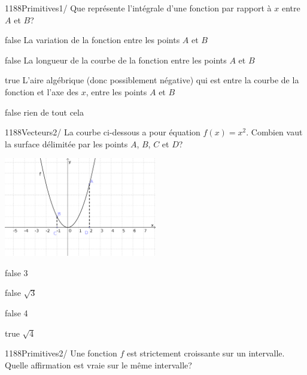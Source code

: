         	\begin{question}{1188}{Primitives}{1}{/}
				Que représente l'intégrale d'une fonction par rapport à $x$ entre $A$ et $B$?
            \end{question}
            \begin{reponses}
            	\item[false] La variation de la fonction entre les points $A$ et $B$
                \item[false] La longueur de la courbe de la fonction entre les points $A$ et $B$
            	\item[true] L'aire algébrique (donc possiblement négative) qui est entre la courbe de la fonction et l'axe des $x$, entre les points $A$ et $B$
                \item[false] rien de tout cela
            \end{reponses}
            \begin{question}{1188}{Vecteurs}{2}{/}
                La courbe ci-dessous a pour équation $f(x)=x^2$. Combien vaut la surface délimitée par les points $A$, $B$, $C$ et $D$?
                \begin{center}
                	\includegraphics[width=0.5\textwidth]{Philippe/Figures_Philippe/primitives_3_2.png}
                \end{center}
            \end{question}
            \begin{reponses}
                \item[false] 3
                \item[false] $\sqrt{3}$
                \item[false] 4
                \item[true] $\sqrt{4}$ 
            \end{reponses}
            \begin{question}{1188}{Primitives}{2}{/}
                Une fonction $f$ est strictement croissante sur un intervalle. Quelle affirmation est vraie sur le même intervalle?
            \end{question}
